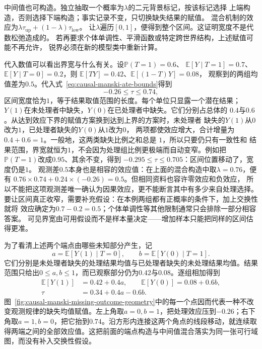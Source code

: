 中间值也可构造。独立抽取一个概率为\(\lambda\)的二元背景标记，按该标记选择
上端构造，否则选择下端构造；事实记录不变，只切换缺失结果的赋值。
混合机制的效应为\(\lambda\tau_{\mathrm{up}}+(1-\lambda)\tau_{\mathrm{low}}\)。
让\(\lambda\)遍历\([0,1]\)，便得到整个区间。这证明宽度不是代数松弛造成的。
若再要求个体单调性、平滑函数或特定跨世界结构，上述赋值可能不再允许，
锐界必须在新的模型类中重新计算。

代入数值可以看出界宽与什么有关。设\(\mathbb P(T=1)=0.6\)、
\(\mathbb E[Y\mid T=1]=0.7\)、\(\mathbb E[Y\mid T=0]=0.2\)，则
\(\mathbb E[TY]=0.42\)、\(\mathbb E[(1-T)Y]=0.08\)，
观察到的两组均值差为\(0.5\)。代入式~\eqref{eq:causal-manski-ate-bounds}得到
\[
  -0.26\leq\tau\leq0.74,
\]
区间宽度恰为\(1\)，等于结果取值范围的长度。每个单位只显露一个潜在结果；
\(Y(1)\)在未处理者中缺失，\(Y(0)\)在已处理者中缺失。它们分别占总体的
\(0.4\)与\(0.6\)。从达到效应下界的赋值方案换到达到上界的方案时，未处理者
缺失的\(Y(1)\)从\(0\)改为\(1\)，已处理者缺失的\(Y(0)\)从\(1\)改为\(0\)，
两项都使效应增大，合计增量为\(0.4+0.6=1\)。一般地，这两类缺失比例之和总是
\(1\)，所以只要仍只有一致性和
结果范围，界宽就恒为\(1\)，不会因为处理组比例更极端而自动变窄。例如把
\(\mathbb P(T=1)\)改成\(0.95\)、其余不变，得到
\(-0.295\leq\tau\leq0.705\)：区间位置移动了，宽度仍是\(1\)。
观测差\(0.5\)本身也是相容的效应值：在上面的混合构造中取\(\lambda=0.76\)，便有
\(0.76\times0.74+0.24\times(-0.26)=0.5\)。但相同资料也容许零效应和负效应，
所以不能把这项观测差唯一确认为因果效应，更不能断言其中有多少来自处理选择。
要让区间真正收窄，需要补充假设：在本例两组都有正概率的条件下，加上交换性就将
效应确定为\(0.7-0.2=0.5\)；个体单调性等其他限制通常只会排除一部分相容答案。
可见界宽由可用假设而不是样本量决定——增加样本只能把同样的区间估得更准。

为了看清上述两个端点由哪些未知部分产生，记
\[
 a=\mathbb E[Y(1)\mid T=0],\qquad
 b=\mathbb E[Y(0)\mid T=1].
\]
它们分别是未处理者缺失的处理结果均值与已处理者缺失的未处理结果均值。结果范围只给出\(0\leq a,b\leq1\)，而已观察部分仍为\(0.42\)与\(0.08\)。逐组相加得到
\[
 \begin{aligned}
 \mathbb E[Y(1)]&=0.42+0.4a,\qquad
 \mathbb E[Y(0)]=0.08+0.6b,\\
 \tau&=0.34+0.4a-0.6b.
 \end{aligned}
\]
图~\ref{fig:causal-manski-missing-outcome-geometry}中的每一个点因而代表一种不改变观测规律的缺失均值赋值。左上角取\(a=0,b=1\)，把处理效应压到\(-0.26\)；右下角取\(a=1,b=0\)，把它抬到\(0.74\)。沿方形内连接这两个角点的线段移动，就连续取得两端之间的全部效应值。这把前面的端点构造与中间值混合落实为同一张可行域图，而没有补入交换性假设。

